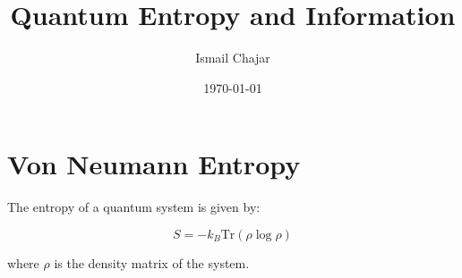 \documentclass{article}
\begin{document}
    \title{Quantum Entropy and Information}
    \author{Ismail Chajar}
    \date{\today}
    \maketitle

    \section{Von Neumann Entropy}
    The entropy of a quantum system is given by:

    \begin{equation}
        S = - k_B \text{Tr}(\rho \log \rho)
    \end{equation}

    where \( \rho \) is the density matrix of the system.

    
\end{document}
